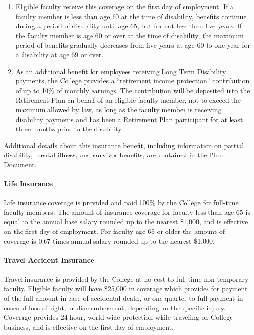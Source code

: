 \begin{enumerate}[label=\alph*)]
{\begin{enumerate}[label=\arabic*)]
							\item{Eligible faculty receive this coverage on the first day of employment.  If a faculty member is less than age 60 at the time of disability, benefits continue during a period of disability until age 65, but for not less than five years.  If the faculty member is age 60 or over at the time of disability, the maximum period of benefits gradually decreases from five years at age 60 to one year for a disability at age 69 or over.}
							\item{As an additional benefit for employees receiving Long Term Disability payments, the College provides a ``retirement income protection'' contribution of up to 10\% of monthly earnings.  The contribution will be deposited into the Retirement Plan on behalf of an eligible faculty member, not to exceed the maximum allowed by law, as long as the faculty member is receiving disability payments and has been a Retirement Plan participant for at least three months prior to the disability.}
						\end{enumerate}
					}

					Additional details about this insurance benefit, including information on partial disability, mental illness, and survivor benefits, are contained in the Plan Document.
				\end{enumerate}
			\paragraph{Life Insurance}
				Life insurance coverage is provided and paid 100\% by the College for
				full-time faculty members.  The amount of insurance coverage for faculty less
				than age 65 is equal to the annual base salary rounded up to the nearest
				\$1,000, and is effective on the first day of employment.  For faculty age 65
				or older the amount of coverage is 0.67 times annual salary rounded up to the
				nearest \$1,000.
			\paragraph{Travel Accident Insurance}
				Travel insurance is provided by the College at no cost to full-time
				non-temporary faculty.  Eligible faculty will have \$25,000 in coverage which provides for payment of the full amount in case of accidental death, or one-quarter to full payment in cases of loss of sight, or dismemberment, depending on the specific injury.  Coverage provides 24-hour, world-wide protection while traveling on College business, and is effective on the first day of employment.
